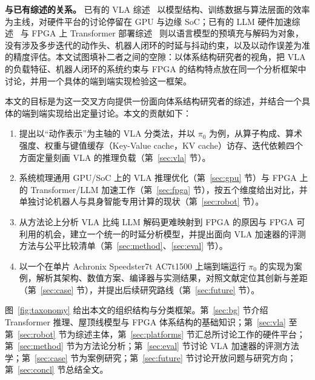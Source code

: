 \documentclass[a4paper,10.5pt]{ctexart}
\newcommand{\pizero}{$\pi_0$}
\begin{document}
\textbf{与已有综述的关系。} 已有的 VLA 综述~\cite{survey_vla,survey_effvla} 以模型结构、训练数据与算法层面的效率为主线，对硬件平台的讨论停留在 GPU 与边缘 SoC；已有的 LLM 硬件加速综述~\cite{survey_llmhw,survey_llmhw2} 与 FPGA 上 Transformer 部署综述~\cite{survey_fpga_tf} 则以语言模型的预填充与解码为对象，没有涉及多步迭代的动作头、机器人闭环的时延与抖动约束，以及以动作误差为准的精度评估。本文试图填补二者之间的空隙：以体系结构研究者的视角，把 VLA 的负载特征、机器人闭环的系统约束与 FPGA 的结构特点放在同一个分析框架中讨论，并用一个具体的端到端实现检验这一框架。

本文的目标是为这一交叉方向提供一份面向体系结构研究者的综述，并结合一个具体的端到端实现给出定量讨论。本文的贡献如下：
\begin{enumerate}
  \item 提出以“动作表示”为主轴的 VLA 分类法，并以 \pizero{} 为例，从算子构成、算术强度、权重与键值缓存（Key-Value cache，KV cache）访存、迭代依赖四个方面定量刻画 VLA 的推理负载（第~\ref{sec:vla} 节）。
  \item 系统梳理通用 GPU/SoC 上的 VLA 推理优化（第~\ref{sec:gpu} 节）与 FPGA 上的 Transformer/LLM 加速工作（第~\ref{sec:fpga} 节），按五个维度给出对比，并单独讨论机器人与具身智能专用计算的现状（第~\ref{sec:robot} 节）。
  \item 从方法论上分析 VLA 比纯 LLM 解码更难映射到 FPGA 的原因与 FPGA 可利用的机会，建立一个统一的时延分析模型，并提出面向 VLA 加速器的评测方法与公平比较清单（第~\ref{sec:method}、\ref{sec:eval} 节）。
  \item 以一个在单片 Achronix Speedster7t AC7t1500 上端到端运行 \pizero{} 的实现为案例，解析其架构、数值方案、编译器与实测结果，对照文献定位其创新与差距（第~\ref{sec:case} 节），并提出后续研究路线（第~\ref{sec:future} 节）。
\end{enumerate}

图~\ref{fig:taxonomy} 给出本文的组织结构与分类框架。第~\ref{sec:bg} 节介绍 Transformer 推理、屋顶线模型与 FPGA 体系结构的基础知识；第~\ref{sec:vla} 至第~\ref{sec:robot} 节为综述主体，第~\ref{sec:platforms} 节汇总所讨论工作的硬件平台；第~\ref{sec:method} 节为方法论分析；第~\ref{sec:eval} 节讨论 VLA 加速器的评测方法学；第~\ref{sec:case} 节为案例研究；第~\ref{sec:future} 节讨论开放问题与研究方向；第~\ref{sec:concl} 节总结全文。
\end{document}
